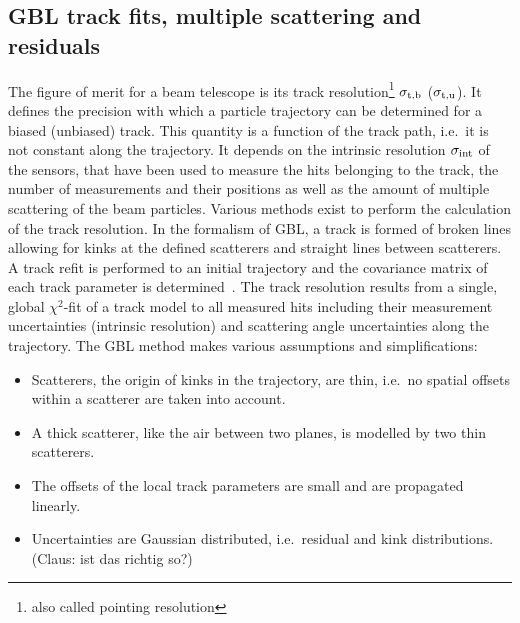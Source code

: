 \subsection{GBL track fits, multiple scattering and residuals}
\label{sec:resmultiple}

The figure of merit for a beam telescope is its track resolution\footnote{also called pointing resolution} $\sigma_{\textrm{t,b}}$ ($\sigma_{\textrm{t,u}}$).
It defines the precision with which a particle trajectory can be determined for a biased (unbiased) track. 
This quantity is a function of the track path, i.e.\ it is not constant along the trajectory. 
It depends on the intrinsic resolution $\sigma_{\textrm{int}}$ of the sensors, that have been used to measure the hits belonging to the track, the number of measurements and their positions
 as well as the amount of multiple scattering of the beam particles.
Various methods exist to perform the calculation of the track resolution. 
In the formalism of GBL, a track is formed of broken lines allowing for kinks at the defined scatterers and straight lines between scatterers. 
A track refit is performed to an initial trajectory and the covariance matrix of each track parameter is determined~\cite{Blobel20111760,Kleinwort-2012}. 
The track resolution results from a single, global $\chi^2$-fit of a track model to all measured hits including their measurement uncertainties (intrinsic resolution)
 and scattering angle uncertainties along the trajectory. 
The GBL method makes various assumptions and simplifications:

\begin{itemize}
 \item Scatterers, the origin of kinks in the trajectory, are thin, i.e.\ no spatial offsets within a scatterer are taken into account. 
 \item A thick scatterer, like the air between two planes, is modelled by two thin scatterers. 
 \item The offsets of the local track parameters are small and are propagated linearly. 
 \item Uncertainties are Gaussian distributed, i.e.\ residual and kink distributions. \\(Claus: ist das richtig so?)
\end{itemize}
 

